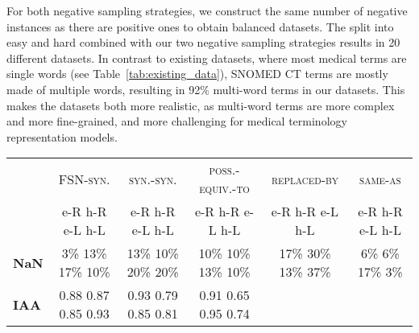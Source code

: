 \documentclass[letterpaper]{article} %
\newcommand{\dataset}[1]{\textsc{#1}}
\begin{document}
For both negative sampling strategies, we construct the same number of negative instances as there are positive ones to obtain balanced datasets.
The split into easy and hard combined with our two negative sampling strategies results in 20 different datasets.
In contrast to existing datasets, where most medical terms are single words (see Table~\ref{tab:existing_data}), SNOMED CT terms are mostly made of multiple words, resulting in 92\% multi-word terms in our datasets.
This makes the datasets both more realistic, as multi-word terms are more complex and more fine-grained, and more challenging for medical terminology representation models.

\begin{table*}[t]
    \centering
    \small
    \begin{tabular}{l ccccc}
    \toprule
        & \dataset{FSN-syn.} & \dataset{syn.-syn.} & \dataset{poss.-equiv.-to} & \dataset{replaced-by} & \dataset{same-as}\\
        \cmidrule(lr){2-2} \cmidrule(lr){3-3} \cmidrule(lr){4-4} \cmidrule(lr){5-5} \cmidrule(lr){6-6}
         & e-R \hspace{0.2cm}  h-R \hspace{0.2cm} e-L \hspace{0.2cm}  h-L & 
         e-R \hspace{0.2cm}  h-R \hspace{0.2cm} e-L \hspace{0.2cm}  h-L &
         e-R \hspace{0.2cm}  h-R \hspace{0.2cm} e-L \hspace{0.2cm}  h-L & 
         e-R \hspace{0.2cm}  h-R \hspace{0.2cm} e-L \hspace{0.2cm}  h-L&
         e-R \hspace{0.2cm}  h-R \hspace{0.2cm} e-L \hspace{0.2cm}  h-L\\ \midrule
         \textbf{NaN} & 3\% \hfill 13\% \hfill 17\% \hfill 10\% &
          13\% \hfill 10\% \hfill 20\% \hfill  20\% &  
          10\% \hfill 10\% \hfill 13\% \hfill 10\% & 
          17\% \hfill 30\% \hfill 13\% \hfill 37\% & 
          6\% \hfill 6\% \hfill 17\% \hfill  3\% \\
         \textbf{IAA} & 0.88 \hfill 0.87 \hfill 0.85 \hfill 0.93 &
         0.93 \hfill 0.79 \hfill 0.85 \hfill 0.81 &
         0.91 \hfill 0.65 \hfill 0.95 \hfill 0.74 & 

\end{tabular}
\end{table*}
\end{document}
